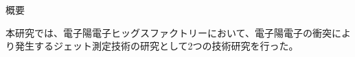 
\begin{center}
\iffalse
\thispagestyle{empty}
{\Large 修士論文テンプレート}\\
九州大学大学院 理学府 物理学専攻 \\ 粒子物理学分野 素粒子実験研究室 \\
素粒子\ 実験 \\[1ex] 指導教員\ 氏\ 名\\ 　 \\
\fi
{\huge 概要}\\
\end{center}
本研究では、電子陽電子ヒッグスファクトリーにおいて、電子陽電子の衝突により発生するジェット測定技術の研究として2つの技術研究を行った。

